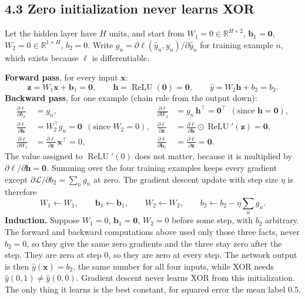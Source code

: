 \documentclass[11pt]{article}
\newcommand{\R}{\mathbb{R}}
\DeclareMathOperator{\ReLU}{ReLU}
\begin{document}
\subsection*{4.3 Zero initialization never learns XOR}
Let the hidden layer have $H$ units, and start from $W_1 = 0\in\R^{H\times2}$, $\mathbf{b}_1 = \mathbf{0}$, $W_2 = 0\in\R^{1\times H}$, $b_2 = 0$. Write $g_n = \partial\ell(\hat y_n, y_n)/\partial\hat y_n$ for training example $n$, which exists because $\ell$ is differentiable.

\textbf{Forward pass}, for every input $\mathbf{x}$:
\[
\mathbf{z} = W_1\mathbf{x}+\mathbf{b}_1 = \mathbf{0},\qquad \mathbf{h} = \ReLU(\mathbf{0}) = \mathbf{0},\qquad \hat y = W_2\mathbf{h}+b_2 = b_2 .
\]
\textbf{Backward pass}, for one example (chain rule from the output down):
\begin{align*}
\frac{\partial\ell}{\partial b_2} &= g_n, &
\frac{\partial\ell}{\partial W_2} &= g_n\,\mathbf{h}^\top = \mathbf{0}^\top \ \ (\text{since } \mathbf{h}=\mathbf{0}),\\
\frac{\partial\ell}{\partial \mathbf{h}} &= W_2^\top g_n = \mathbf{0} \ \ (\text{since } W_2 = 0), &
\frac{\partial\ell}{\partial \mathbf{z}} &= \frac{\partial\ell}{\partial \mathbf{h}}\odot\ReLU'(\mathbf{z}) = \mathbf{0},\\
\frac{\partial\ell}{\partial W_1} &= \frac{\partial\ell}{\partial \mathbf{z}}\,\mathbf{x}^\top = 0, &
\frac{\partial\ell}{\partial \mathbf{b}_1} &= \frac{\partial\ell}{\partial \mathbf{z}} = \mathbf{0}.
\end{align*}
The value assigned to $\ReLU'(0)$ does not matter, because it is multiplied by $\partial\ell/\partial\mathbf{h} = \mathbf{0}$. Summing over the four training examples keeps every gradient except $\partial\mathcal{L}/\partial b_2 = \sum_n g_n$ at zero. The gradient descent update with step size $\eta$ is therefore
\[
W_1 \leftarrow W_1,\qquad \mathbf{b}_1\leftarrow\mathbf{b}_1,\qquad W_2\leftarrow W_2,\qquad b_2\leftarrow b_2 - \eta\textstyle\sum_n g_n .
\]
\textbf{Induction.} Suppose $W_1 = 0$, $\mathbf{b}_1 = \mathbf{0}$, $W_2 = 0$ before some step, with $b_2$ arbitrary. The forward and backward computations above used only those three facts, never $b_2 = 0$, so they give the same zero gradients and the three stay zero after the step. They are zero at step 0, so they are zero at every step. The network output is then $\hat y(\mathbf{x}) = b_2$, the same number for all four inputs, while XOR needs $\hat y(0,1)\ne\hat y(0,0)$. Gradient descent never learns XOR from this initialization. The only thing it learns is the best constant, for squared error the mean label $0.5$.
\end{document}
